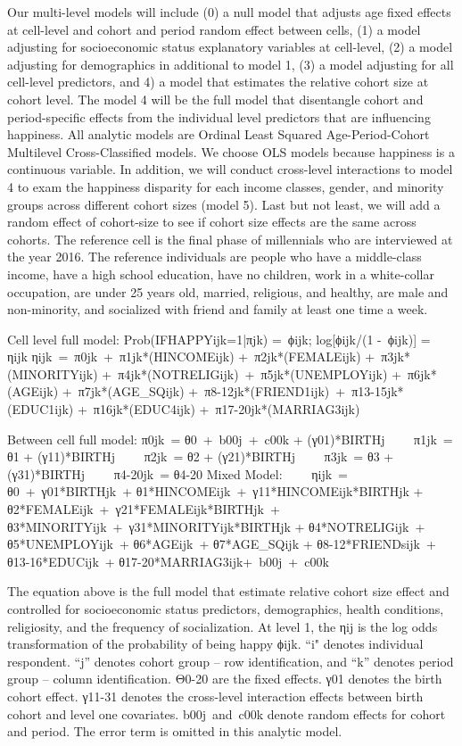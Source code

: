 Our multi-level models will include (0) a null model that adjusts age fixed effects at cell-level and cohort and period random effect between cells, (1) a model adjusting for socioeconomic status explanatory variables at cell-level, (2) a model adjusting for demographics in additional to model 1, (3) a model adjusting for all cell-level predictors, and 4) a model that estimates the relative cohort size at cohort level. The model 4 will be the full model that disentangle cohort and period-specific effects from the individual level predictors that are influencing happiness. All analytic models are Ordinal Least Squared Age-Period-Cohort Multilevel Cross-Classified models. We choose OLS models because happiness is a continuous variable. In addition, we will conduct cross-level interactions to model 4 to exam the happiness disparity for each income classes, gender, and minority groups across different cohort sizes (model 5). Last but not least, we will add a random effect of cohort-size to see if cohort size effects are the same across cohorts. The reference cell is the final phase of millennials who are interviewed at the year 2016. The reference individuals are people who have a middle-class income, have a high school education, have no children, work in a white-collar occupation, are under 25 years old, married, religious, and healthy, are male and non-minority, and socialized with friend and family at least one time a week.

Cell level full model:
Prob(IFHAPPYijk=1|πjk) = ϕijk; log[ϕijk/(1 - ϕijk)] = ηijk ηijk = π0jk + π1jk*(HINCOMEijk) + π2jk*(FEMALEijk) + π3jk*(MINORITYijk) + π4jk*(NOTRELIGijk) + π5jk*(UNEMPLOYijk) + π6jk*(AGEijk) + π7jk*(AGE_SQijk) + π8-12jk*(FRIEND1ijk) + π13-15jk*(EDUC1ijk) + π16jk*(EDUC4ijk) + π17-20jk*(MARRIAG3ijk)

Between cell full model:
π0jk = θ0 + b00j + c00k + (γ01)*BIRTHj     π1jk = θ1 + (γ11)*BIRTHj     π2jk = θ2 + (γ21)*BIRTHj     π3jk = θ3 + (γ31)*BIRTHj     π4-20jk = θ4-20
Mixed Model:    
ηijk = θ0 + γ01*BIRTHjk + θ1*HINCOMEijk + γ11*HINCOMEijk*BIRTHjk + θ2*FEMALEijk + γ21*FEMALEijk*BIRTHjk + θ3*MINORITYijk + γ31*MINORITYijk*BIRTHjk + θ4*NOTRELIGijk + θ5*UNEMPLOYijk + θ6*AGEijk + θ7*AGE_SQijk + θ8-12*FRIENDsijk + θ13-16*EDUCijk + θ17-20*MARRIAG3ijk+ b00j + c00k

The equation above is the full model that estimate relative cohort size effect and controlled for socioeconomic status predictors, demographics, health conditions, religiosity, and the frequency of socialization. At level 1, the ηij is the log odds transformation of the probability of being happy ϕijk. “i" denotes individual respondent. “j” denotes cohort group – row identification, and “k” denotes period group – column identification. Θ0-20 are the fixed effects. γ01 denotes the birth cohort effect. γ11-31 denotes the cross-level interaction effects between birth cohort and level one covariates. b00j and c00k denote random effects for cohort and period. The error term is omitted in this analytic model.

